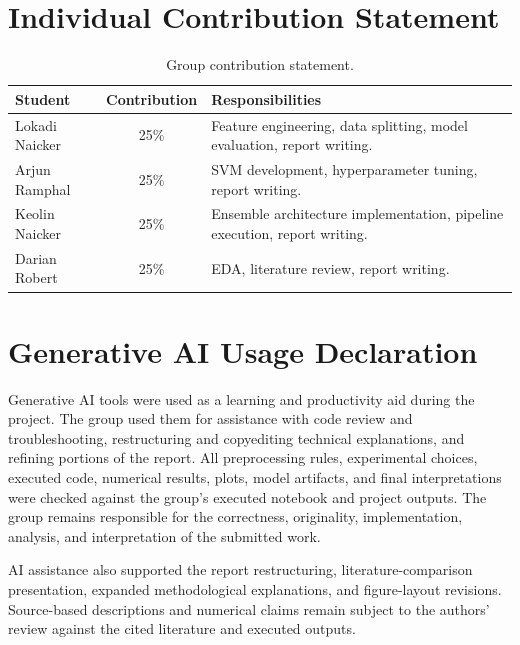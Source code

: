 \documentclass[11pt,a4paper]{article}
\begin{document}
\clearpage
\appendix
\section{Individual Contribution Statement}

\begin{table}[htbp]
\centering
\small
\begin{tabularx}{\textwidth}{@{}lcX@{}}
\toprule
\textbf{Student} & \textbf{Contribution} & \textbf{Responsibilities}\\
\midrule
Lokadi Naicker & 25\% & Feature engineering, data splitting, model evaluation, report writing.\\
Arjun Ramphal & 25\% & SVM development, hyperparameter tuning, report writing.\\
Keolin Naicker & 25\% & Ensemble architecture implementation, pipeline execution, report writing.\\
Darian Robert & 25\% & EDA, literature review, report writing.\\
\bottomrule
\end{tabularx}
\caption{Group contribution statement.}
\end{table}\section{Generative AI Usage Declaration}

Generative AI tools were used as a learning and productivity aid during the project. The group used them for assistance with code review and troubleshooting, restructuring and copyediting technical explanations, and refining portions of the report. All preprocessing rules, experimental choices, executed code, numerical results, plots, model artifacts, and final interpretations were checked against the group's executed notebook and project outputs. The group remains responsible for the correctness, originality, implementation, analysis, and interpretation of the submitted work.

AI assistance also supported the report restructuring, literature-comparison presentation, expanded methodological explanations, and figure-layout revisions. Source-based descriptions and numerical claims remain subject to the authors' review against the cited literature and executed outputs.
\end{document}
